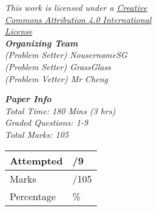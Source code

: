 {\begin{multicols*}{2}
  \vspace*{5pt}

  \textit{This work is licensed under a \href{http://creativecommons.org/licenses/by/4.0/}{Creative \\ \hspace*{12pt} Commons Attribution 4.0 International \\ \hspace*{12pt} License}} \\

  \textit{\textbf{\Large{Organizing Team}} \\
          \large
          \hspace*{12pt} (Problem Setter) NousernameSG \\
          \hspace*{12pt} (Problem Setter) GrassGlass \\
          \hspace*{12pt} (Problem Vetter) Mr Cheng \\
  }

  \textit{\textbf{\Large{Paper Info}} \\
        \large
        \hspace*{12pt} Total Time: 180 Mins (3 hrs) \\
        \hspace*{12pt} Graded Questions: 1-9 \\
        \hspace*{12pt} Total Marks: 105
  }
        \vspace*{5pt}

        \begin{tabularx}{0.37\textwidth} {
          | >{\centering\arraybackslash}X
          | >{\centering\arraybackslash}X | }
          \hline
          Attempted & \phantom{9}/9 \\
          \hline
          Marks & \phantom{105}/105 \\
          \hline
          Percentage & \phantom{100}\% \\
          \hline
      \end{tabularx}
  \end{multicols*}
}

\newpage



